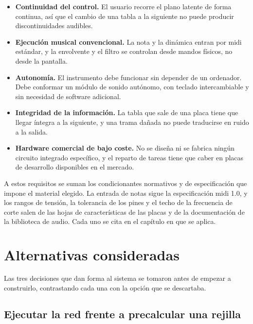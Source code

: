 \begin{itemize}
    \item \textbf{Continuidad del control.} El usuario recorre el plano latente
          de forma continua, así que el cambio de una tabla a la siguiente no
          puede producir discontinuidades audibles.
    \item \textbf{Ejecución musical convencional.} La nota y la dinámica entran
          por \gls{midi} estándar, y la envolvente y el filtro se controlan
          desde mandos físicos, no desde la pantalla.
    \item \textbf{Autonomía.} El instrumento debe funcionar sin depender de un ordenador.
          Debe conformar un módulo de sonido autónomo, con teclado intercambiable y sin necesidad de
          software adicional.
    \item \textbf{Integridad de la información.} La tabla que sale de una placa
          tiene que llegar íntegra a la siguiente, y una trama dañada no puede
          traducirse en ruido a la salida.
    \item \textbf{Hardware comercial de bajo coste.} No se diseña ni se fabrica
          ningún circuito integrado específico, y el reparto de tareas tiene que
          caber en placas de desarrollo disponibles en el mercado.
\end{itemize}

A estos requisitos se suman los condicionantes normativos y de especificación
que impone el material elegido. La entrada de notas sigue la especificación
\gls{midi} 1.0, y los rangos de tensión, la tolerancia de los pines y el techo
de la frecuencia de corte salen de las hojas de características de las placas y
de la documentación de la biblioteca de audio. Cada uno se cita en el capítulo
en que se aplica.

\section{Alternativas consideradas}
\label{sec:alternativas}
\hypertarget{RE2.1}{}\label{RE2.1}

Las tres decisiones que dan forma al sistema se tomaron antes de empezar a
construirlo, contrastando cada una con la opción que se descartaba.

\subsection{Ejecutar la red frente a precalcular una rejilla}

